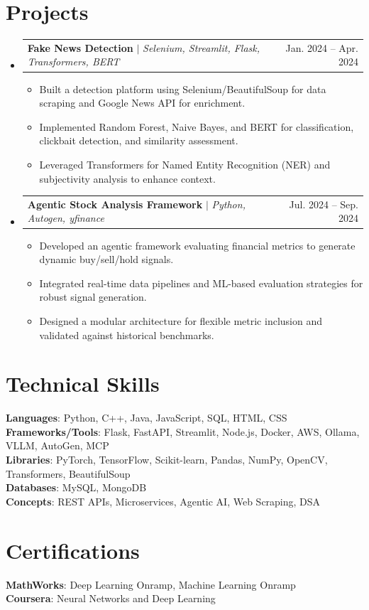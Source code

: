 \documentclass[letterpaper,11pt]{article}
\makeatletter
\newcommand{\resumeItem}[1]{
  \item\small{
    {#1}
  }
}
\newcommand{\resumeProjectHeading}[2]{
    \item
    \begin{tabular*}{0.97\textwidth}{l@{\extracolsep{\fill}}r}
      \small#1 & #2 \\
    \end{tabular*}\vspace{-7pt}
}
\newcommand{\resumeSubHeadingListStart}{\begin{itemize}[leftmargin=0.15in, label={}]}
\newcommand{\resumeSubHeadingListEnd}{\end{itemize}}
\newcommand{\resumeItemListStart}{\begin{itemize}[itemsep=0pt, parsep=0pt]}
\newcommand{\resumeItemListEnd}{\end{itemize}\vspace{-5pt}}
\makeatother
\begin{document}
\section{\textcolor{blue(pigment)}{Projects}}
  \resumeSubHeadingListStart
    \resumeProjectHeading
      {\textbf{Fake News Detection} $|$ \emph{Selenium, Streamlit, Flask, Transformers, BERT}}{Jan. 2024 -- Apr. 2024}
      \resumeItemListStart
        \resumeItem{Built a detection platform using Selenium/BeautifulSoup for data scraping and Google News API for enrichment.}
        \resumeItem{Implemented Random Forest, Naive Bayes, and BERT for classification, clickbait detection, and similarity assessment.}
        \resumeItem{Leveraged Transformers for Named Entity Recognition (NER) and subjectivity analysis to enhance context.}
      \resumeItemListEnd

    \resumeProjectHeading
      {\textbf{Agentic Stock Analysis Framework} $|$ \emph{Python, Autogen, yfinance}}{Jul. 2024 -- Sep. 2024}
      \resumeItemListStart
        \resumeItem{Developed an agentic framework evaluating financial metrics to generate dynamic buy/sell/hold signals.}
        \resumeItem{Integrated real-time data pipelines and ML-based evaluation strategies for robust signal generation.}
        \resumeItem{Designed a modular architecture for flexible metric inclusion and validated against historical benchmarks.}
      \resumeItemListEnd
  \resumeSubHeadingListEnd

\section{\textcolor{blue(pigment)}{Technical Skills}}
 \begin{itemize}[leftmargin=0.15in, label={}]
    \small{\item{
     \textbf{Languages}{: Python, C++, Java, JavaScript, SQL, HTML, CSS} \\
     \textbf{Frameworks/Tools}{: Flask, FastAPI, Streamlit, Node.js, Docker, AWS, Ollama, VLLM, AutoGen, MCP} \\
     \textbf{Libraries}{: PyTorch, TensorFlow, Scikit-learn, Pandas, NumPy, OpenCV, Transformers, BeautifulSoup} \\
     \textbf{Databases}{: MySQL, MongoDB} \\
     \textbf{Concepts}{: REST APIs, Microservices, Agentic AI, Web Scraping, DSA}
    }}
 \end{itemize}

\section{\textcolor{blue(pigment)}{Certifications}}
 \begin{itemize}[leftmargin=0.15in, label={}]
    \small{\item{
     \textbf{MathWorks}: Deep Learning Onramp, Machine Learning Onramp \\
     \textbf{Coursera}: Neural Networks and Deep Learning
    }}
 \end{itemize}
\end{document}

